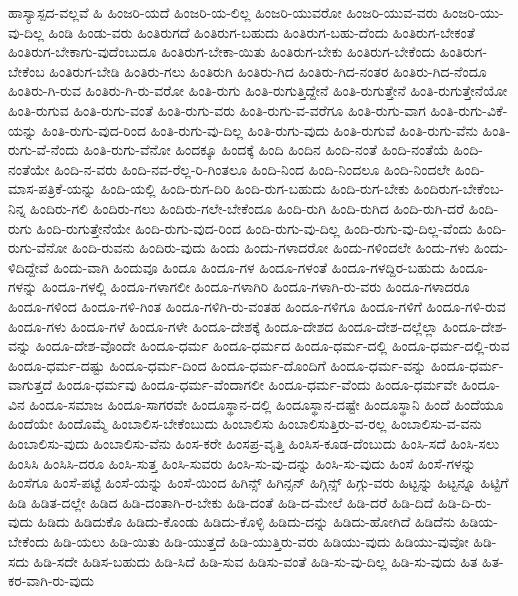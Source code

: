{ಹಾಸ್ಯಾಸ್ಪದ-ವಲ್ಲವೆ
ಹಿ
ಹಿಂಜರಿ-ಯದೆ
ಹಿಂಜರಿ-ಯ-ಲಿಲ್ಲ
ಹಿಂಜರಿ-ಯುವರೋ
ಹಿಂಜರಿ-ಯುವ-ವರು
ಹಿಂಜರಿ-ಯು-ವು-ದಿಲ್ಲ
ಹಿಂಡಿ
ಹಿಂಡು-ವರು
ಹಿಂತಿರುಗದೆ
ಹಿಂತಿರುಗ-ಬಹುದು
ಹಿಂತಿರುಗ-ಬಹು-ದೆಂದು
ಹಿಂತಿರುಗ-ಬೇಕಂತೆ
ಹಿಂತಿರುಗ-ಬೇಕಾಗು-ವುದೆಂಬುದೂ
ಹಿಂತಿರುಗ-ಬೇಕಾ-ಯಿತು
ಹಿಂತಿರುಗ-ಬೇಕು
ಹಿಂತಿರುಗ-ಬೇಕೆಂದು
ಹಿಂತಿರುಗ-ಬೇಕೆಂಬ
ಹಿಂತಿರುಗ-ಬೇಡಿ
ಹಿಂತಿರು-ಗಲು
ಹಿಂತಿರುಗಿ
ಹಿಂತಿರು-ಗಿದ
ಹಿಂತಿರು-ಗಿದ-ನಂತರ
ಹಿಂತಿರು-ಗಿದ-ನೆಂದೂ
ಹಿಂತಿರು-ಗಿ-ರುವ
ಹಿಂತಿರು-ಗಿ-ರು-ವರೋ
ಹಿಂತಿ-ರುಗು
ಹಿಂತಿ-ರುಗುತ್ತಿದ್ದೇನೆ
ಹಿಂತಿ-ರುಗುತ್ತೇನೆ
ಹಿಂತಿ-ರುಗುತ್ತೇನೆಯೋ
ಹಿಂತಿ-ರುಗುವ
ಹಿಂತಿ-ರುಗು-ವಂತೆ
ಹಿಂತಿ-ರುಗು-ವರು
ಹಿಂತಿ-ರುಗು-ವ-ವರೆಗೂ
ಹಿಂತಿ-ರುಗು-ವಾಗ
ಹಿಂತಿ-ರುಗು-ವಿಕೆ-ಯನ್ನು
ಹಿಂತಿ-ರುಗು-ವುದ-ರಿಂದ
ಹಿಂತಿ-ರುಗು-ವು-ದಿಲ್ಲ
ಹಿಂತಿ-ರುಗು-ವುದು
ಹಿಂತಿ-ರುಗುವೆ
ಹಿಂತಿ-ರುಗು-ವೆನು
ಹಿಂತಿ-ರುಗು-ವೆ-ನೆಂದು
ಹಿಂತಿ-ರುಗು-ವೆನೋ
ಹಿಂದಕ್ಕೂ
ಹಿಂದಕ್ಕೆ
ಹಿಂದಿ
ಹಿಂದಿನ
ಹಿಂದಿ-ನಂತೆ
ಹಿಂದಿ-ನಂತೆಯೆ
ಹಿಂದಿ-ನಂತೆಯೇ
ಹಿಂದಿ-ನ-ವರು
ಹಿಂದಿ-ನವ-ರೆಲ್ಲ-ರಿ-ಗಿಂತಲೂ
ಹಿಂದಿ-ನಿಂದ
ಹಿಂದಿ-ನಿಂದಲೂ
ಹಿಂದಿ-ನಿಂದಲೇ
ಹಿಂದಿ-ಮಾಸ-ಪತ್ರಿಕೆ-ಯನ್ನು
ಹಿಂದಿ-ಯಲ್ಲಿ
ಹಿಂದಿ-ರುಗ-ದಿರಿ
ಹಿಂದಿ-ರುಗ-ಬಹುದು
ಹಿಂದಿ-ರುಗ-ಬೇಕು
ಹಿಂದಿರುಗ-ಬೇಕೆಂಬ-ನಿನ್ನ
ಹಿಂದಿರು-ಗಲಿ
ಹಿಂದಿರು-ಗಲು
ಹಿಂದಿರು-ಗಲೇ-ಬೇಕೆಂದೂ
ಹಿಂದಿ-ರುಗಿ
ಹಿಂದಿ-ರುಗಿದ
ಹಿಂದಿ-ರುಗಿ-ದರೆ
ಹಿಂದಿ-ರುಗು
ಹಿಂದಿ-ರುಗುತ್ತೇನೆಯೇ
ಹಿಂದಿ-ರುಗು-ವುದ-ರಿಂದ
ಹಿಂದಿ-ರುಗು-ವು-ದಿಲ್ಲ
ಹಿಂದಿ-ರುಗು-ವು-ದಿಲ್ಲ-ವೆಂದು
ಹಿಂದಿ-ರುಗು-ವೆನೋ
ಹಿಂದಿ-ರುವನು
ಹಿಂದಿರು-ವುದು
ಹಿಂದು
ಹಿಂದು-ಗಳಾದರೋ
ಹಿಂದು-ಗಳಿಂದಲೇ
ಹಿಂದು-ಗಳು
ಹಿಂದು-ಳಿದಿದ್ದೇವೆ
ಹಿಂದು-ವಾಗಿ
ಹಿಂದುವೂ
ಹಿಂದೂ
ಹಿಂದೂ-ಗಳ
ಹಿಂದೂ-ಗಳಂತೆ
ಹಿಂದೂ-ಗಳದ್ದಿರ-ಬಹುದು
ಹಿಂದೂ-ಗಳನ್ನು
ಹಿಂದೂ-ಗಳಲ್ಲಿ
ಹಿಂದೂ-ಗಳಾಗಲೀ
ಹಿಂದೂ-ಗಳಾಗಿರಿ
ಹಿಂದೂ-ಗಳಾಗಿ-ರು-ವರು
ಹಿಂದೂ-ಗಳಾದರೂ
ಹಿಂದೂ-ಗಳಿಂದ
ಹಿಂದೂ-ಗಳಿ-ಗಿಂತ
ಹಿಂದೂ-ಗಳಿಗಿ-ರು-ವಂತಹ
ಹಿಂದೂ-ಗಳಿಗೂ
ಹಿಂದೂ-ಗಳಿಗೆ
ಹಿಂದೂ-ಗಳಿ-ರುವ
ಹಿಂದೂ-ಗಳು
ಹಿಂದೂ-ಗಳೆ
ಹಿಂದೂ-ಗಳೇ
ಹಿಂದೂ-ದೇಶಕ್ಕೆ
ಹಿಂದೂ-ದೇಶದ
ಹಿಂದೂ-ದೇಶ-ದಲ್ಲೆಲ್ಲಾ
ಹಿಂದೂ-ದೇಶ-ವನ್ನು
ಹಿಂದೂ-ದೇಶ-ವೊಂದೇ
ಹಿಂದೂ-ಧರ್ಮ
ಹಿಂದೂ-ಧರ್ಮದ
ಹಿಂದೂ-ಧರ್ಮ-ದಲ್ಲಿ
ಹಿಂದೂ-ಧರ್ಮ-ದಲ್ಲಿ-ರುವ
ಹಿಂದೂ-ಧರ್ಮ-ದಷ್ಟು
ಹಿಂದೂ-ಧರ್ಮ-ದಿಂದ
ಹಿಂದೂ-ಧರ್ಮ-ದೊಂದಿಗೆ
ಹಿಂದೂ-ಧರ್ಮ-ವನ್ನು
ಹಿಂದೂ-ಧರ್ಮ-ವಾಗುತ್ತದೆ
ಹಿಂದೂ-ಧರ್ಮವು
ಹಿಂದೂ-ಧರ್ಮ-ವೆಂದಾಗಲೀ
ಹಿಂದೂ-ಧರ್ಮ-ವೆಂದು
ಹಿಂದೂ-ಧರ್ಮವೇ
ಹಿಂದೂ-ವಿನ
ಹಿಂದೂ-ಸಮಾಜ
ಹಿಂದೂ-ಸಾಗರವೇ
ಹಿಂದೂಸ್ಥಾನ-ದಲ್ಲಿ
ಹಿಂದೂಸ್ಥಾನ-ದಷ್ಟೇ
ಹಿಂದೂಸ್ಥಾನಿ
ಹಿಂದೆ
ಹಿಂದೆಯೂ
ಹಿಂದೆಯೇ
ಹಿಂದೊಮ್ಮೆ
ಹಿಂಬಾಲಿಸ-ಬೇಕೆಂಬುದು
ಹಿಂಬಾಲಿಸು
ಹಿಂಬಾಲಿಸುತ್ತಿರು-ವ-ರಲ್ಲ
ಹಿಂಬಾಲಿಸು-ವ-ವನು
ಹಿಂಬಾಲಿಸು-ವುದು
ಹಿಂಬಾಲಿಸು-ವೆನು
ಹಿಂಸ-ಕರೇ
ಹಿಂಸಪ್ರ-ವೃತ್ತಿ
ಹಿಂಸಿಸ-ಕೂಡ-ದೆಂಬುದು
ಹಿಂಸಿ-ಸದೆ
ಹಿಂಸಿ-ಸಲು
ಹಿಂಸಿಸಿ
ಹಿಂಸಿಸಿ-ದರೂ
ಹಿಂಸಿ-ಸುತ್ತ
ಹಿಂಸಿ-ಸುವರು
ಹಿಂಸಿ-ಸು-ವು-ದನ್ನು
ಹಿಂಸಿ-ಸು-ವುದು
ಹಿಂಸೆ
ಹಿಂಸೆ-ಗಳನ್ನು
ಹಿಂಸೆಗೂ
ಹಿಂಸೆ-ಪಟ್ಟೆ
ಹಿಂಸೆ-ಯನ್ನು
ಹಿಂಸೆ-ಯಿಂದ
ಹಿಗಿನ್ಸ್
ಹಿಗಿನ್ಸನ್
ಹಿಗ್ಗಿನ್ಸ್
ಹಿಗ್ಗು-ವರು
ಹಿಟ್ಟನ್ನು
ಹಿಟ್ಟನ್ನೂ
ಹಿಟ್ಟಿಗೆ
ಹಿಡಿ
ಹಿಡಿತ-ದಲ್ಲೇ
ಹಿಡಿದ
ಹಿಡಿ-ದಂತಾಗಿ-ರ-ಬೇಕು
ಹಿಡಿ-ದಂತೆ
ಹಿಡಿ-ದ-ಮೇಲೆ
ಹಿಡಿ-ದರೆ
ಹಿಡಿ-ದಿದೆ
ಹಿಡಿ-ದಿ-ರು-ವುದು
ಹಿಡಿದು
ಹಿಡಿದುಕೊ
ಹಿಡಿದು-ಕೊಂಡು
ಹಿಡಿದು-ಕೊಳ್ಳಿ
ಹಿಡಿದು-ದನ್ನು
ಹಿಡಿದು-ಹೋಗಿದೆ
ಹಿಡಿದೆನು
ಹಿಡಿಯ-ಬೇಕೆಂದು
ಹಿಡಿ-ಯಲು
ಹಿಡಿ-ಯಿತು
ಹಿಡಿ-ಯುತ್ತದೆ
ಹಿಡಿ-ಯುತ್ತಿರು-ವರು
ಹಿಡಿಯು-ವುದು
ಹಿಡಿಯು-ವುವೋ
ಹಿಡಿ-ಸದು
ಹಿಡಿ-ಸದೇ
ಹಿಡಿಸ-ಬಹುದು
ಹಿಡಿ-ಸಿದೆ
ಹಿಡಿ-ಸುವ
ಹಿಡಿಸು-ವಂತೆ
ಹಿಡಿ-ಸು-ವು-ದಿಲ್ಲ
ಹಿಡಿ-ಸು-ವುದು
ಹಿತ
ಹಿತ-ಕರ-ವಾಗಿ-ರು-ವುದು
}
